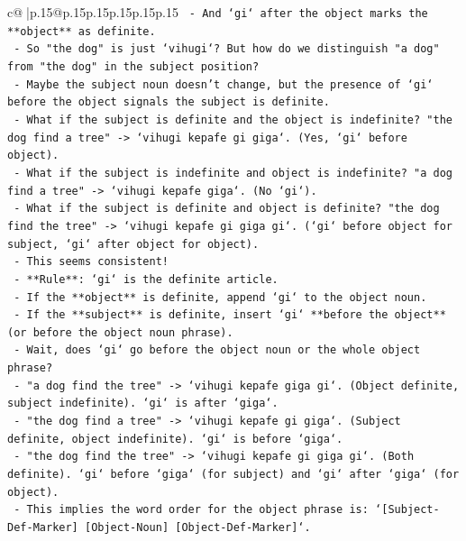 \documentclass{article}
\begin{document}
{\begin{supertabular}{c@{$\;$}|p{.15\linewidth}@{}p{.15\linewidth}p{.15\linewidth}p{.15\linewidth}p{.15\linewidth}p{.15\linewidth}}
{{{\texttt{                  {-} And `gi` after the object marks the **object** as definite.} \\
\texttt{                  {-} So "the dog" is just `vihugi`? But how do we distinguish "a dog" from "the dog" in the subject position?} \\
\texttt{                  {-} Maybe the subject noun doesn't change, but the presence of `gi` before the object signals the subject is definite.} \\
\texttt{                  {-} What if the subject is definite and the object is indefinite? "the dog find a tree" {-}> `vihugi kepafe gi giga`. (Yes, `gi` before object).} \\
\texttt{                  {-} What if the subject is indefinite and object is indefinite? "a dog find a tree" {-}> `vihugi kepafe giga`. (No `gi`).} \\
\texttt{                  {-} What if the subject is definite and object is definite? "the dog find the tree" {-}> `vihugi kepafe gi giga gi`. (`gi` before object for subject, `gi` after object for object).} \\
\texttt{                  {-} This seems consistent!} \\
\texttt{                  {-} **Rule**: `gi` is the definite article.} \\
\texttt{                    {-} If the **object** is definite, append `gi` to the object noun.} \\
\texttt{                    {-} If the **subject** is definite, insert `gi` **before the object** (or before the object noun phrase).} \\
\texttt{                    {-} Wait, does `gi` go before the object noun or the whole object phrase?} \\
\texttt{                    {-} "a dog find the tree" {-}> `vihugi kepafe giga gi`. (Object definite, subject indefinite). `gi` is after `giga`.} \\
\texttt{                    {-} "the dog find a tree" {-}> `vihugi kepafe gi giga`. (Subject definite, object indefinite). `gi` is before `giga`.} \\
\texttt{                    {-} "the dog find the tree" {-}> `vihugi kepafe gi giga gi`. (Both definite). `gi` before `giga` (for subject) and `gi` after `giga` (for object).} \\
\texttt{                  {-} This implies the word order for the object phrase is: `{[}Subject{-}Def{-}Marker{]} {[}Object{-}Noun{]} {[}Object{-}Def{-}Marker{]}`.} \\
}}}
\end{supertabular}}
\end{document}
